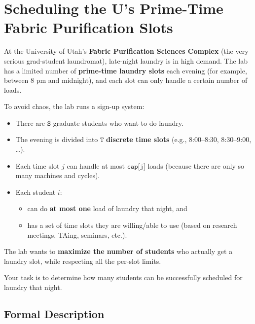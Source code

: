\section*{Scheduling the U's Prime-Time Fabric Purification Slots}

At the University of Utah's \textbf{Fabric Purification Sciences Complex} (the
very serious grad-student laundromat), late-night laundry is in high demand. The
lab has a limited number of \textbf{prime-time laundry slots} each evening (for
example, between 8 pm and midnight), and each slot can only handle a certain
number of loads.

To avoid chaos, the lab runs a sign-up system:
\begin{itemize}
    \item There are \(\texttt{S}\) graduate students who want to do laundry.
    \item The evening is divided into \(\texttt{T}\) \textbf{discrete time
    slots} (e.g., 8{:}00--8{:}30, 8{:}30--9{:}00, \dots).
    \item Each time slot \(j\) can handle at most \(\texttt{cap[j]}\) loads
    (because there are only so many machines and cycles).
    \item Each student \(i\):
    \begin{itemize}
        \item can do \textbf{at most one} load of laundry that night, and
        \item has a set of time slots they are willing/able to use (based on
        research meetings, TAing, seminars, etc.).
    \end{itemize}
\end{itemize}

The lab wants to \textbf{maximize the number of students} who actually get a
laundry slot, while respecting all the per-slot limits.

Your task is to determine how many students can be successfully scheduled for
laundry that night.

\subsection*{Formal Description}

